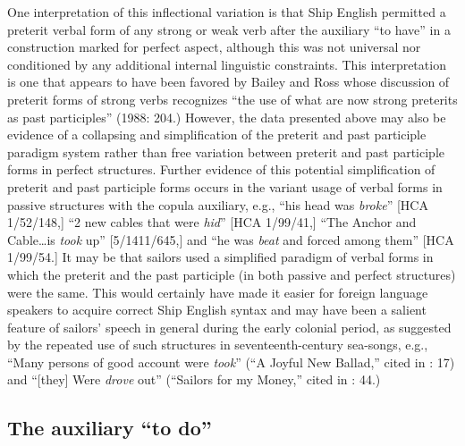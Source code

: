 One interpretation of this inflectional variation is that Ship English permitted a preterit verbal form of any strong or weak verb after the auxiliary “to have” in a construction marked for perfect aspect, although this was not universal nor conditioned by any additional internal linguistic constraints. This interpretation is one that appears to have been favored by Bailey and Ross whose discussion of preterit forms of strong verbs recognizes “the use of what are now strong preterits as past participles” (1988: 204.) However, the data presented above may also be evidence of a collapsing and simplification of the preterit and past participle paradigm system rather than free variation between preterit and past participle forms in perfect structures. Further evidence of this potential simplification of preterit and past participle forms occurs in the variant usage of verbal forms in passive structures with the copula auxiliary, e.g., “his head was \textit{broke}” [HCA 1/52/148,] “2 new cables that were \textit{hid}” [HCA 1/99/41,] “The Anchor and Cable…is \textit{took} up” [5/1411/645,] and “he was \textit{beat} and forced among them” [HCA 1/99/54.] It may be that sailors used a simplified paradigm of verbal forms in which the preterit and the past participle (in both passive and perfect structures) were the same. This would certainly have made it easier for foreign language speakers to acquire correct Ship English syntax and may have been a salient feature of sailors’ speech in general during the early colonial period, as suggested by the repeated use of such structures in seventeenth-century sea-songs, e.g., “Many persons of good account were \textit{took}” (“A Joyful New Ballad,” cited in \citealt{Palmer1986}: 17) and “[they] Were \textit{drove} out” (“Sailors for my Money,” cited in \citealt{Palmer1986}: 44.) 

\subsection{\textbf{The} \textbf{auxiliary} \textbf{“to} \textbf{do”}}%

